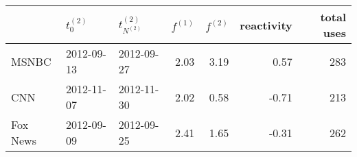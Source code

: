 \begin{tabular}{lllrrrr}
\toprule
{} & $t_0^{(2)}$ & $t^{(2)}_{N^{(2)}}$ & $f^{(1)}$ & $f^{(2)}$ & reactivity & total uses \\
\midrule
MSNBC    &  2012-09-13 &          2012-09-27 &      2.03 &      3.19 &       0.57 &        283 \\
CNN      &  2012-11-07 &          2012-11-30 &      2.02 &      0.58 &      -0.71 &        213 \\
Fox News &  2012-09-09 &          2012-09-25 &      2.41 &      1.65 &      -0.31 &        262 \\
\bottomrule
\end{tabular}
